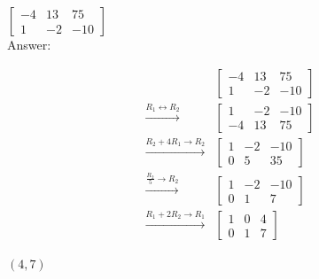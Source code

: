 \documentclass[11pt]{exam}
\begin{document}
\begin{questions}
\(\displaystyle{ \left[\begin{array}{cc|c} -4 & 13 & 75 \\ 1 & -2 & -10 \end{array}\right] }\)\\

 Answer: \fillin[][2in]
\begin{solution}
\[\begin{aligned} & \left[\begin{array}{cc|c} -4 & 13 & 75 \\ 1 & -2 & -10 \end{array}\right] \\ \xrightarrow{R_1 \leftrightarrow R_2} & \left[\begin{array}{cc|c} 1 & -2 & -10 \\ -4 & 13 & 75 \end{array}\right] \\ \xrightarrow{R_2 + 4R_1 \to R_2} & \left[\begin{array}{cc|c} 1 & -2 & -10 \\ 0 & 5 & 35 \end{array}\right] \\ \xrightarrow{\frac{R_2}{5} \to R_2} & \left[\begin{array}{cc|c} 1 & -2 & -10 \\ 0 & 1 & 7 \end{array}\right] \\ \xrightarrow{R_1 + 2R_2 \to R_1} & \left[\begin{array}{cc|c} 1 & 0 & 4 \\ 0 & 1 & 7 \end{array}\right] \end{aligned}\]

\(\boxed{ (4, 7) }\)
\end{solution}

\label{exact-endoch}
\newpage

\headerbox{\oci}
\label{exact-startoci}


\end{questions}
\end{document}
